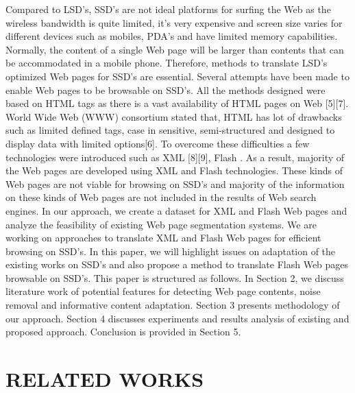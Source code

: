 \documentclass[fleqn,twoside]{article}
\begin{document}
Compared to LSD's, SSD's are not ideal platforms for surfing the Web as the wireless bandwidth is quite limited, it's very expensive and screen size varies for different devices such as mobiles, PDA's  and have limited memory capabilities. Normally, the content of a single Web page will be larger than contents that can be accommodated in a mobile phone. Therefore, methods to translate LSD's optimized Web pages for SSD's are essential. Several attempts have been made to enable Web pages to be browsable on SSD's. All the methods designed were based on HTML tags as there is a vast availability of HTML pages on Web [5][7]. World Wide Web (WWW) consortium stated that, HTML has lot of drawbacks such as limited defined tags, case in sensitive, semi-structured and designed to display data with limited options[6]. To overcome these difficulties a few technologies were introduced such as XML [8][9], Flash . As a result, majority of the Web pages are developed using XML and Flash technologies. These kinds of Web pages are not viable for browsing on SSD's and majority of the information on these kinds of Web pages are not included in the results of Web search engines.
\vskip 2mm		
In our approach, we create a dataset for XML and Flash Web pages and analyze the feasibility of existing Web page segmentation systems. We are working on approaches to translate XML and Flash Web pages for efficient browsing on SSD's. In this paper, we will highlight issues on adaptation of the existing works on SSD's and also propose a method to translate Flash Web pages browsable on SSD's. This paper is structured as follows. In Section 2, we discuss literature work of potential features for detecting Web page contents, noise removal and informative content adaptation. Section 3 presents methodology of our approach. Section 4 discusses experiments and results analysis of existing and proposed approach. Conclusion is provided in Section 5.

\section{RELATED WORKS}
\label {section:RoL}
\end{document}
